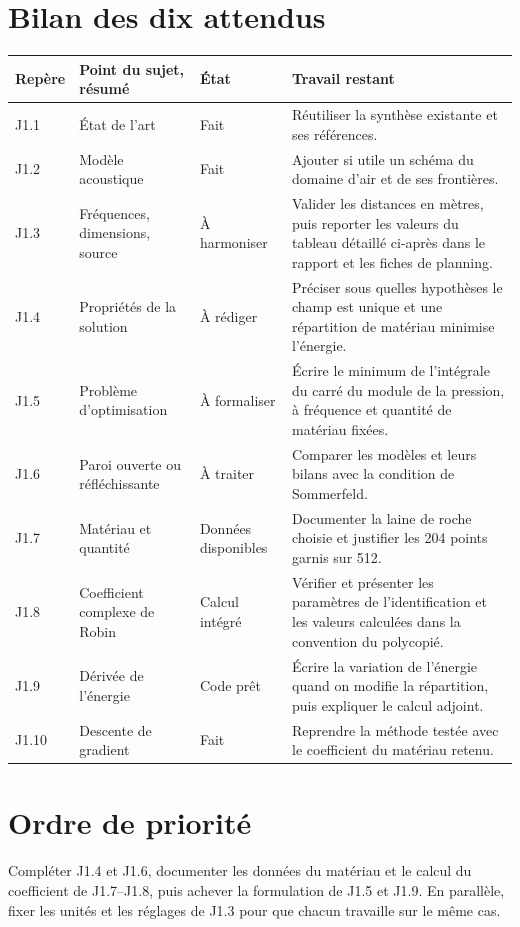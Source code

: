 \documentclass[10pt,a4paper]{article}
\begin{document}
\section*{Bilan des dix attendus}
\begin{tabularx}{\textwidth}{@{}>{\raggedright\arraybackslash}p{1.3cm}>{\raggedright\arraybackslash}p{3.0cm}>{\raggedright\arraybackslash}p{2.1cm}>{\raggedright\arraybackslash}X@{}}
\toprule
\textbf{Repère} & \textbf{Point du sujet, résumé} & \textbf{État} & \textbf{Travail restant}\\
\midrule
J1.1 & État de l'art & Fait & Réutiliser la synthèse existante et ses références.\\[3pt]
J1.2 & Modèle acoustique & Fait & Ajouter si utile un schéma du domaine d'air et de ses frontières.\\[3pt]
J1.3 & Fréquences, dimensions, source & À harmoniser & Valider les distances en mètres, puis reporter les valeurs du tableau détaillé ci-après dans le rapport et les fiches de planning.\\[3pt]
J1.4 & Propriétés de la solution & À rédiger & Préciser sous quelles hypothèses le champ est unique et une répartition de matériau minimise l'énergie.\\[3pt]
J1.5 & Problème d'optimisation & À formaliser & Écrire le minimum de l'intégrale du carré du module de la pression, à fréquence et quantité de matériau fixées.\\[3pt]
J1.6 & Paroi ouverte ou réfléchissante & À traiter & Comparer les modèles et leurs bilans avec la condition de Sommerfeld.\\[3pt]
J1.7 & Matériau et quantité & Données disponibles & Documenter la laine de roche choisie et justifier les 204 points garnis sur 512.\\[3pt]
J1.8 & Coefficient complexe de Robin & Calcul intégré & Vérifier et présenter les paramètres de l’identification et les valeurs calculées dans la convention du polycopié.\\[3pt]
J1.9 & Dérivée de l'énergie & Code prêt & Écrire la variation de l'énergie quand on modifie la répartition, puis expliquer le calcul adjoint.\\[3pt]
J1.10 & Descente de gradient & Fait & Reprendre la méthode testée avec le coefficient du matériau retenu.\\
\bottomrule
\end{tabularx}

\section*{Ordre de priorité}
Compléter J1.4 et J1.6, documenter les données du matériau et le calcul du coefficient de J1.7--J1.8, puis achever la formulation de J1.5 et J1.9. En parallèle, fixer les unités et les réglages de J1.3 pour que chacun travaille sur le même cas.
\end{document}
